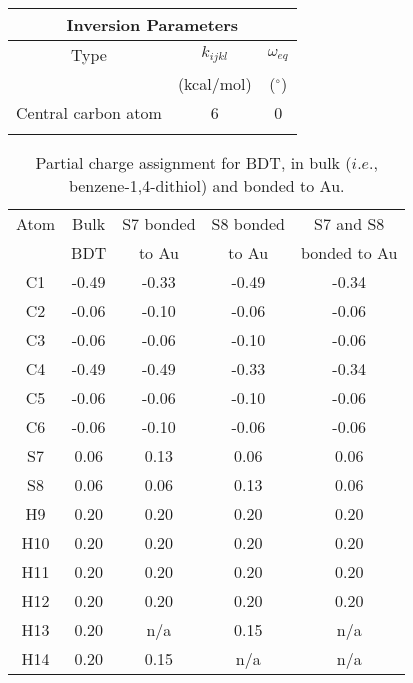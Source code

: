 \documentclass[10pt]{report}  %
\newcommand{\T}{\rule{0pt}{2.6ex}}
\newcommand{\B}{\rule[-1.2ex]{0pt}{0pt}}
\newcommand{\degree}{\ensuremath{^\circ}}
\begin{document}
\begin{table} []
\begin{tabular}{ c  c  c }
\multicolumn{3}{c}{Inversion Parameters } \\
	\hline
 Type \T \B & $k_{ijkl}$ & $\omega_{eq}$ \\
 \T \B & (kcal/mol) & (\degree) \\
	\hline
 Central carbon atom \T \B & 6 & 0 \\
	\hline \\ 

\end{tabular}
\label{table:bdt-parameters}
\end{table}

\begin{table} []
\caption{Partial charge assignment for BDT, in bulk ($i.e.$, benzene-1,4-dithiol) and bonded to Au.}
\centering
\begin{tabular}{ c  c  c  c  c  }
	\hline \hline
Atom \T & Bulk & S7 bonded & S8 bonded& S7 and S8 \\
\B & BDT & to Au & to Au & bonded to Au \\
	\hline
C1 \T \B & -0.49 & -0.33  & -0.49 & -0.34 \\
C2 \T \B & -0.06 & -0.10  & -0.06 & -0.06 \\
C3 \T \B &  -0.06 & -0.06 & -0.10  & -0.06 \\
C4 \T \B & -0.49  & -0.49 & -0.33 & -0.34 \\
C5 \T \B &  -0.06 & -0.06 & -0.10 & -0.06 \\
C6 \T \B &  -0.06 & -0.10 & -0.06 & -0.06 \\
S7 \T \B &  0.06 & 0.13 & 0.06 & 0.06 \\
S8 \T \B &  0.06 & 0.06 & 0.13 & 0.06 \\
H9 \T \B &  0.20 & 0.20 & 0.20 & 0.20 \\
H10 \T \B & 0.20 & 0.20 & 0.20 & 0.20 \\
H11 \T \B & 0.20 & 0.20 & 0.20 & 0.20 \\
H12 \T \B & 0.20 & 0.20 & 0.20 & 0.20 \\
H13 \T \B & 0.20 & n/a  & 0.15 & n/a \\
H14 \T \B & 0.20 & 0.15 & n/a & n/a \\
	\hline
        \hline
\end{tabular}
\label{table:partial-charges}
\end{table}
\end{document}
